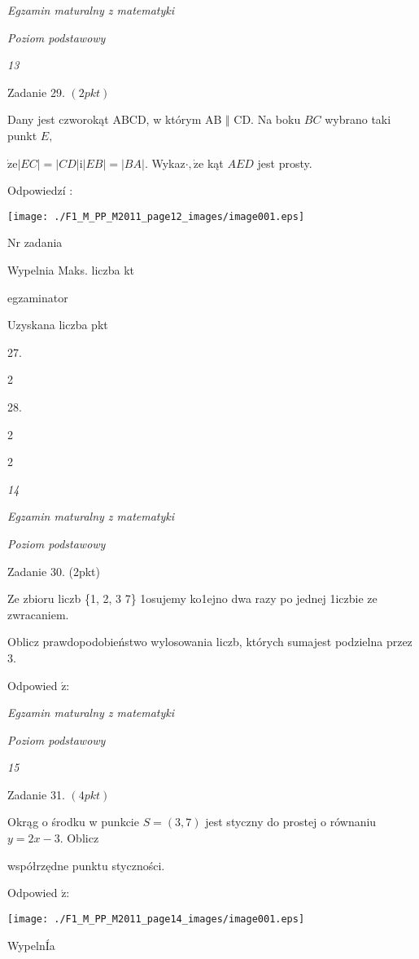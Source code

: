 \documentclass[a4paper,12pt]{article}
\begin{document}
{\it Egzamin maturalny z matematyki}

{\it Poziom podstawowy}

{\it 13}

Zadanie 29. $(2pkt)$

Dany jest czworokąt ABCD, w którym AB $\Vert$ CD. Na boku $BC$ wybrano taki punkt $E,$

$\dot{\mathrm{z}}\mathrm{e}|EC|=|CD|\mathrm{i}|EB|=|BA|$. Wykaz$\cdot, \dot{\mathrm{z}}\mathrm{e}$ kąt $AED$ jest prosty.

Odpowiedzí :
\begin{center}
\texttt{[image: ./F1\_M\_PP\_M2011\_page12\_images/image001.eps]}
\end{center}
Nr zadania

Wypelnia Maks. liczba kt

egzaminator

Uzyskana liczba pkt

27.

2

28.

2

2





{\it 14}

{\it Egzamin maturalny z matematyki}

{\it Poziom podstawowy}

Zadanie 30. (2pkt)

Ze zbioru liczb \{1, 2, 3 7\} 1osujemy ko1ejno dwa razy po jednej 1iczbie ze zwracaniem.

Oblicz prawdopodobieństwo wylosowania liczb, których sumajest podzielna przez 3.

Odpowied $\acute{\mathrm{z}}$:





{\it Egzamin maturalny z matematyki}

{\it Poziom podstawowy}

{\it 15}

Zadanie 31. $(4pkt)$

Okrąg o środku w punkcie $S=(3,7)$ jest styczny do prostej o równaniu $y=2x-3$. Oblicz

współrzędne punktu styczności.

Odpowied $\acute{\mathrm{z}}$:
\begin{center}
\texttt{[image: ./F1\_M\_PP\_M2011\_page14\_images/image001.eps]}
\end{center}
WypelnÍa
\end{document}
